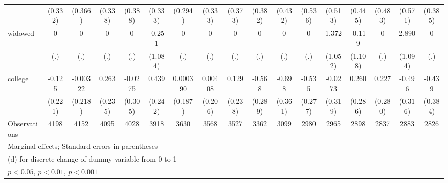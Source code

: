 {\begin{tabular}{l*{16}{c}}
                    &     (0.332)         &     (0.366)         &     (0.338)         &     (0.388)         &     (0.333)         &     (0.294)         &     (0.333)         &     (0.373)         &     (0.382)         &     (0.432)         &     (0.536)         &     (0.513)         &     (0.445)         &     (0.483)         &     (0.571)         &     (0.385)         \\
[1em]
widowed             &           0         &           0         &           0         &           0         &      -0.251         &           0         &           0         &           0         &           0         &           0         &           0         &       1.372         &      -0.119         &           0         &       2.890\sym{**} &           0         \\
                    &         (.)         &         (.)         &         (.)         &         (.)         &     (1.084)         &         (.)         &         (.)         &         (.)         &         (.)         &         (.)         &         (.)         &     (1.052)         &     (1.108)         &         (.)         &     (1.094)         &         (.)         \\
[1em]
college             &      -0.125         &    -0.00322         &       0.263         &     -0.0275         &       0.439         &    0.000390         &     0.00408         &       0.129         &      -0.568\sym{*}  &      -0.698         &      -0.535         &     -0.0273         &       0.260         &       0.227         &      -0.496         &      -0.439         \\
                    &     (0.221)         &     (0.218)         &     (0.235)         &     (0.305)         &     (0.242)         &     (0.187)         &     (0.206)         &     (0.238)         &     (0.289)         &     (0.361)         &     (0.277)         &     (0.319)         &     (0.286)         &     (0.280)         &     (0.316)         &     (0.384)         \\
\hline
Observations        &        4198         &        4152         &        4095         &        4028         &        3918         &        3630         &        3568         &        3527         &        3362         &        3099         &        2980         &        2965         &        2898         &        2837         &        2883         &        2826         \\
\hline\hline
\multicolumn{17}{l}{\footnotesize Marginal effects; Standard errors in parentheses}\\
\multicolumn{17}{l}{\footnotesize  (d) for discrete change of dummy variable from 0 to 1}\\
\multicolumn{17}{l}{\footnotesize \sym{*} \(p<0.05\), \sym{**} \(p<0.01\), \sym{***} \(p<0.001\)}\\
\end{tabular}
}
